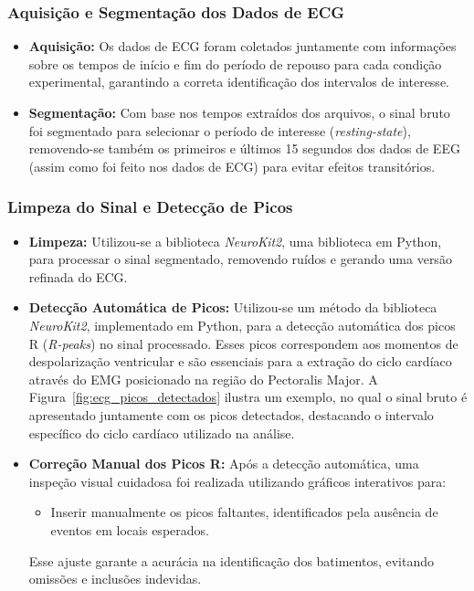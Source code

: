 \subsubsection{Aquisição e Segmentação dos Dados de ECG}
\begin{itemize}
    \item \textbf{Aquisição:} Os dados de ECG foram coletados juntamente com informações sobre os tempos de início e fim do período de repouso para cada condição experimental, garantindo a correta identificação dos intervalos de interesse.
    \item \textbf{Segmentação:} Com base nos tempos extraídos dos arquivos, o sinal bruto foi segmentado para selecionar o período de interesse (\textit{resting-state}), removendo-se também os primeiros e últimos 15 segundos dos dados de EEG (assim como foi feito nos dados de ECG) para evitar efeitos transitórios.
\end{itemize}

\subsubsection{Limpeza do Sinal e Detecção de Picos}
\begin{itemize}
    \item \textbf{Limpeza:} Utilizou-se a biblioteca \textit{NeuroKit2}, uma biblioteca em Python, para processar o sinal segmentado, removendo ruídos e gerando uma versão refinada do ECG.
    \item \textbf{Detecção Automática de Picos:} Utilizou-se um método da biblioteca \textit{NeuroKit2}, implementado em Python, para a detecção automática dos picos R (\textit{R-peaks}) no sinal processado. Esses picos correspondem aos momentos de despolarização ventricular e são essenciais para a extração do ciclo cardíaco através do EMG posicionado na região do Pectoralis Major. A Figura~\ref{fig:ecg_picos_detectados} ilustra um exemplo, no qual o sinal bruto é apresentado juntamente com os picos detectados, destacando o intervalo específico do ciclo cardíaco utilizado na análise.
    \item \textbf{Correção Manual dos Picos R:} Após a detecção automática, uma inspeção visual cuidadosa foi realizada utilizando gráficos interativos para:
    \begin{itemize}
        \item Inserir manualmente os picos faltantes, identificados pela ausência de eventos em locais esperados.
    \end{itemize}
    
    Esse ajuste garante a acurácia na identificação dos batimentos, evitando omissões e inclusões indevidas.
\end{itemize}

